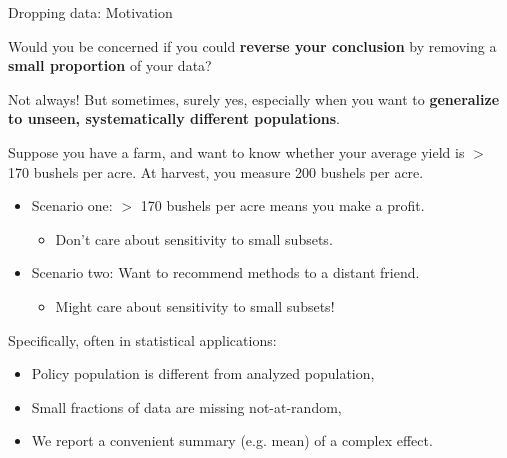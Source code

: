 \begin{frame}{Dropping data: Motivation}

Would you be concerned if you could \textbf{reverse your conclusion} by removing
a \textbf{small proportion} of your data?

\vspace{1em}
Not always!  But sometimes, surely yes, especially when you want to
\textbf{generalize to unseen, systematically different populations}.

\vspace{1em}
Suppose you have a farm, and want to know whether
your average yield is $>$ 170 bushels per acre.
At harvest, you measure 200 bushels per acre.

\begin{itemize}
    \item Scenario one: $>$ 170 bushels
        per acre means you make a profit.
        \begin{itemize}
            \item Don’t care about sensitivity to small subsets.
        \end{itemize}
    \item Scenario two: Want to recommend methods to a distant friend.
    \begin{itemize}
        \item Might care about sensitivity to small subsets!
    \end{itemize}
\end{itemize}


\vspace{1em}
Specifically, often in statistical applications:
%
\begin{itemize}
\item Policy population is different from analyzed population,
\item Small fractions of data are missing not-at-random,
\item We report a convenient summary (e.g. mean) of a complex effect.
\end{itemize}


\end{frame}
